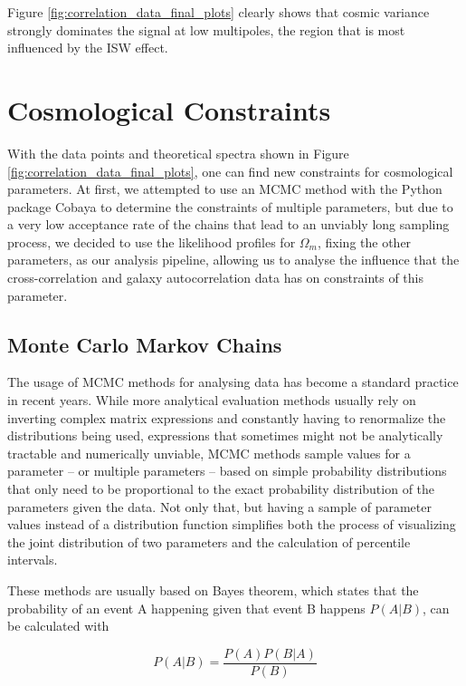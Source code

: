 \documentclass[openany,a4paper,12pt,oneside]{book}
\begin{document}
\begin{spacing}{1.5}
Figure \ref{fig:correlation_data_final_plots} clearly shows that cosmic variance strongly dominates the signal at low multipoles, the region that is most influenced by the ISW effect.


\chapter{Cosmological Constraints}\label{chapter:constraints}

With the data points and theoretical spectra shown in Figure \ref{fig:correlation_data_final_plots}, one can find new constraints for cosmological parameters. At first, we attempted to use an MCMC method with the Python package Cobaya \cite{CobayaASCL, Cobaya_preprint} to determine the constraints of multiple parameters, but due to a very low acceptance rate of the chains that lead to an unviably long sampling process, we decided to use the likelihood profiles for $\Omega_m$, fixing the other parameters, as our analysis pipeline, allowing us to analyse the influence that the cross-correlation and galaxy autocorrelation data has on constraints of this parameter.

\section{Monte Carlo Markov Chains}

The usage of MCMC methods for analysing data has become a standard practice in recent years. While more analytical evaluation methods usually rely on inverting complex matrix expressions and constantly having to renormalize the distributions being used, expressions that sometimes might not be analytically tractable and numerically unviable, MCMC methods sample values for a parameter -- or multiple parameters -- based on simple probability distributions that only need to be proportional to the exact probability distribution of the parameters given the data. Not only that, but having a sample of parameter values instead of a distribution function simplifies both the process of visualizing the joint distribution of two parameters and the calculation of percentile intervals.

These methods are usually based on Bayes theorem, which states that the probability of an event A happening given that event B happens $P(A|B)$, can be calculated with

\begin{equation}\label{bayes_theorem}
	P(A|B)=\frac{P(A)P(B|A)}{P(B)}
\end{equation}


\end{spacing}
\end{document}
